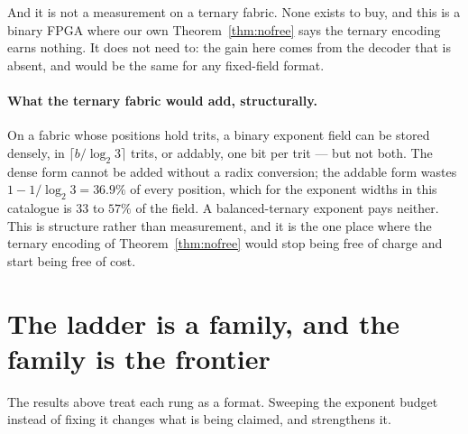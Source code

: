 And it is not a measurement on a ternary fabric. None exists to buy, and this is a
binary FPGA where our own Theorem~\ref{thm:nofree} says the ternary encoding earns
nothing. It does not need to: the gain here comes from the decoder that is absent,
and would be the same for any fixed-field format.

\paragraph{What the ternary fabric would add, structurally.} On a fabric whose
positions hold trits, a binary exponent field can be stored densely, in
$\lceil b/\log_2 3\rceil$ trits, or addably, one bit per trit --- but not both. The
dense form cannot be added without a radix conversion; the addable form wastes
$1 - 1/\log_2 3 = 36.9\%$ of every position, which for the exponent widths in this
catalogue is $33$ to $57\%$ of the field. A balanced-ternary exponent pays neither.
This is structure rather than measurement, and it is the one place where the
ternary encoding of Theorem~\ref{thm:nofree} would stop being free of charge and
start being free of cost.



\section{The ladder is a family, and the family is the frontier}


\label{sec:frontier}

The results above treat each rung as a format. Sweeping the exponent budget instead
of fixing it changes what is being claimed, and strengthens it.

